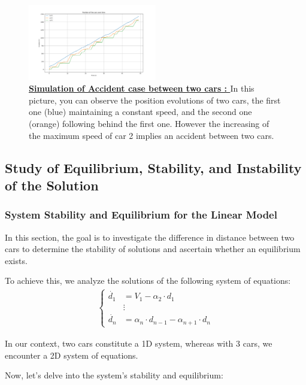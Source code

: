 \documentclass{article}
\begin{document}
		
		\begin{figure}[H]
			\centering
			\includegraphics[width=0.5\textwidth]{Model1W3C_O_Aco_I2.png}
			\caption[Simulation of Accident case between two cars]{\textbf{\underline{Simulation of Accident case between two cars : }} In this picture, you can observe the position evolutions of two cars, the first one (blue) maintaining a constant speed, and the second one (orange) following behind the first one. However the increasing of the maximum speed of car 2 implies an accident between two cars.}
			\label{fig:Model1W3C_O_Aco_I2}
		\end{figure}
		
		
		
		\subsection{Study of Equilibrium, Stability, and Instability of the Solution}
		\subsubsection{System Stability and Equilibrium for the Linear Model}
		In this section, the goal is to investigate the difference in distance between two cars to determine the stability of solutions and ascertain whether an equilibrium exists.
		
		To achieve this, we analyze the solutions of the following system of equations:
		\begin{align*}
			\begin{cases}
				\dot{d_1} &= V_1 - \alpha_2 \cdot d_1 \\
				&\vdots \\
				\dot{d_n} &= \alpha_n \cdot d_{n-1} - \alpha_{n+1} \cdot d_n
			\end{cases}
		\end{align*}
		
		In our context, two cars constitute a 1D system, whereas with 3 cars, we encounter a 2D system of equations.
		
		Now, let's delve into the system's stability and equilibrium:
		
\end{document}
